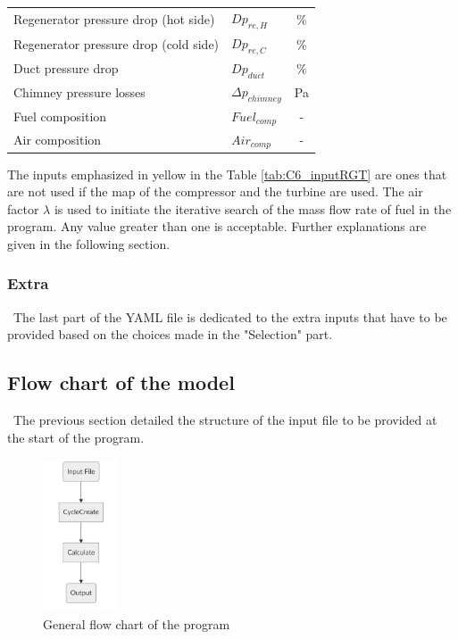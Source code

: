 \begin{longtable}[c]{@{}llc@{}}
Regenerator pressure drop (hot side)  & $Dp_{re,H}$                               & \%            \\
Regenerator pressure drop (cold side) & $Dp_{re,C}$                               & \%            \\
Duct pressure drop                    & $Dp_{duct}$                               & \%            \\
Chimney pressure losses               & $\Delta p_{chimney}$                      & Pa            \\
Fuel composition                      & $Fuel_{comp}$                             & -             \\
Air composition                       & $Air_{comp}$                              & -             \\* \bottomrule
\end{longtable}

The inputs emphasized in yellow in the Table \ref{tab:C6_inputRGT} are ones that are not used if the map of the compressor and the turbine are used. The air factor $\lambda$ is used to initiate the iterative search of the mass flow rate of fuel in the program. Any value greater than one is acceptable. Further explanations are given in the following section.


\subsubsection{Extra}
\quad\ The last part of the YAML file is dedicated to the extra inputs that have to be provided based on the choices made in the "Selection" part. 

\subsection{Flow chart of the model}
\quad\,  The previous section detailed the structure of the input file to be provided at the start of the program.  
\begin{figure}[h]
\centering
\includegraphics[width=0.2\textwidth]{Chapitre_6/Images/GeneralFlowChart.png}
\caption{General flow chart of the program}
\label{fig:C6_flowchart}
\end{figure}


